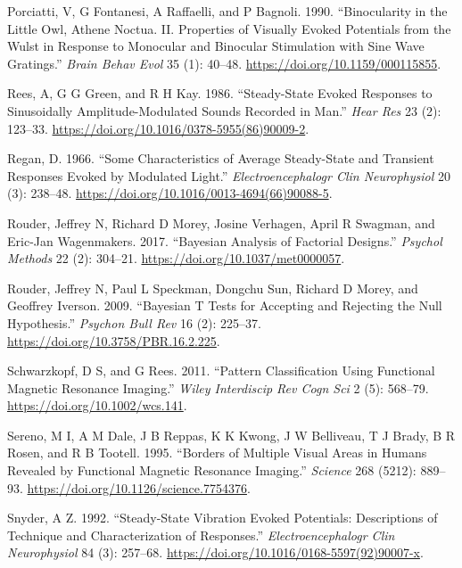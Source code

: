 \documentclass[]{article}
\begin{document}
\leavevmode\hypertarget{ref-Porciatti1990}{}%
Porciatti, V, G Fontanesi, A Raffaelli, and P Bagnoli. 1990. ``Binocularity in the Little Owl, Athene Noctua. II. Properties of Visually Evoked Potentials from the Wulst in Response to Monocular and Binocular Stimulation with Sine Wave Gratings.'' \emph{Brain Behav Evol} 35 (1): 40--48. \url{https://doi.org/10.1159/000115855}.

\leavevmode\hypertarget{ref-Rees1986}{}%
Rees, A, G G Green, and R H Kay. 1986. ``Steady-State Evoked Responses to Sinusoidally Amplitude-Modulated Sounds Recorded in Man.'' \emph{Hear Res} 23 (2): 123--33. \url{https://doi.org/10.1016/0378-5955(86)90009-2}.

\leavevmode\hypertarget{ref-Regan1966}{}%
Regan, D. 1966. ``Some Characteristics of Average Steady-State and Transient Responses Evoked by Modulated Light.'' \emph{Electroencephalogr Clin Neurophysiol} 20 (3): 238--48. \url{https://doi.org/10.1016/0013-4694(66)90088-5}.

\leavevmode\hypertarget{ref-Rouder2017}{}%
Rouder, Jeffrey N, Richard D Morey, Josine Verhagen, April R Swagman, and Eric-Jan Wagenmakers. 2017. ``Bayesian Analysis of Factorial Designs.'' \emph{Psychol Methods} 22 (2): 304--21. \url{https://doi.org/10.1037/met0000057}.

\leavevmode\hypertarget{ref-Rouder2009}{}%
Rouder, Jeffrey N, Paul L Speckman, Dongchu Sun, Richard D Morey, and Geoffrey Iverson. 2009. ``Bayesian T Tests for Accepting and Rejecting the Null Hypothesis.'' \emph{Psychon Bull Rev} 16 (2): 225--37. \url{https://doi.org/10.3758/PBR.16.2.225}.

\leavevmode\hypertarget{ref-Schwarzkopf2011}{}%
Schwarzkopf, D S, and G Rees. 2011. ``Pattern Classification Using Functional Magnetic Resonance Imaging.'' \emph{Wiley Interdiscip Rev Cogn Sci} 2 (5): 568--79. \url{https://doi.org/10.1002/wcs.141}.

\leavevmode\hypertarget{ref-Sereno1995}{}%
Sereno, M I, A M Dale, J B Reppas, K K Kwong, J W Belliveau, T J Brady, B R Rosen, and R B Tootell. 1995. ``Borders of Multiple Visual Areas in Humans Revealed by Functional Magnetic Resonance Imaging.'' \emph{Science} 268 (5212): 889--93. \url{https://doi.org/10.1126/science.7754376}.

\leavevmode\hypertarget{ref-Snyder1992}{}%
Snyder, A Z. 1992. ``Steady-State Vibration Evoked Potentials: Descriptions of Technique and Characterization of Responses.'' \emph{Electroencephalogr Clin Neurophysiol} 84 (3): 257--68. \url{https://doi.org/10.1016/0168-5597(92)90007-x}.
\end{document}
